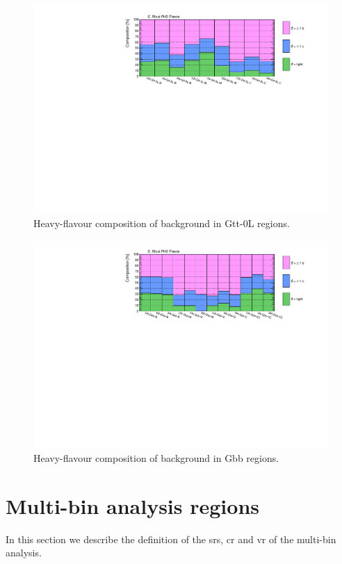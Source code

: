 \begin{figure}[h]
\includegraphics[width=\textwidth]{figures/strong_prod/comp_plots/Gtt_0L_HF.pdf}
\caption{Heavy-flavour composition of \ttbar background in Gtt-0L regions.}
	\label{fig:HFcomp_Gtt0L}
\end{figure}

\begin{figure}[h]
\includegraphics[width=\textwidth]{figures/strong_prod/comp_plots/Gbb_HF.pdf}
\caption{Heavy-flavour composition of \ttbar background in Gbb regions.}
	\label{fig:HFcomp_Gbb}
\end{figure}



\section{Multi-bin analysis regions}
\label{sec:strong:multibin}
In this section we describe the definition of the \glspl{sr}, \gls{cr} and \gls{vr} 
of the multi-bin analysis. 

